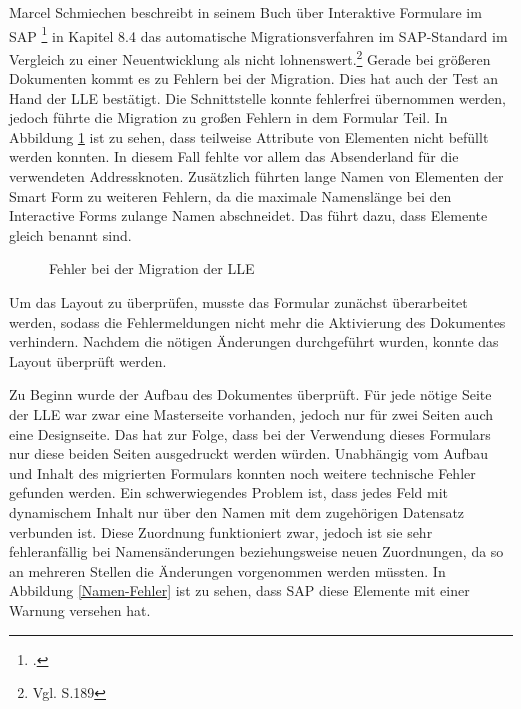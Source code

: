 Marcel Schmiechen beschreibt in seinem Buch über Interaktive Formulare im SAP \footcite{Schmiechen.2016} in Kapitel 8.4 das automatische Migrationsverfahren im SAP-Standard im Vergleich zu einer Neuentwicklung als nicht lohnenswert.\footnote{Vgl. \cite{Schmiechen.2016} S.189} Gerade bei größeren Dokumenten kommt es zu Fehlern bei der Migration. Dies hat auch der Test an Hand der \ac{LLE} bestätigt. Die Schnittstelle konnte fehlerfrei übernommen werden, jedoch führte die Migration zu großen Fehlern in dem Formular Teil. In Abbildung \ref{Migration} ist zu sehen, dass teilweise Attribute von Elementen nicht befüllt werden konnten. In diesem Fall fehlte vor allem das Absenderland für die verwendeten Addressknoten. Zusätzlich führten lange Namen von Elementen der Smart Form zu weiteren Fehlern, da die maximale Namenslänge bei den Interactive Forms zulange Namen abschneidet. Das führt dazu, dass Elemente gleich benannt sind.
\begin{figure}[ht]
	\centering
	\caption{Fehler bei der Migration der \acs{LLE}}
	\label{Migration}
\end{figure}
Um das Layout zu überprüfen, musste das Formular zunächst überarbeitet werden, sodass die Fehlermeldungen nicht mehr die Aktivierung des Dokumentes verhindern. Nachdem die nötigen Änderungen durchgeführt wurden, konnte das Layout überprüft werden. 

Zu Beginn wurde der Aufbau des Dokumentes überprüft. Für jede nötige Seite der \ac{LLE} war zwar eine Masterseite vorhanden, jedoch nur für zwei Seiten auch eine Designseite. Das hat zur Folge, dass bei der Verwendung dieses Formulars nur diese beiden Seiten ausgedruckt werden würden. Unabhängig vom Aufbau und Inhalt des migrierten Formulars konnten noch weitere technische Fehler gefunden werden. Ein schwerwiegendes Problem ist, dass jedes Feld mit dynamischem Inhalt nur über den Namen mit dem zugehörigen Datensatz verbunden ist. Diese Zuordnung funktioniert zwar, jedoch ist sie sehr fehleranfällig bei Namensänderungen beziehungsweise neuen Zuordnungen, da so an mehreren Stellen die Änderungen vorgenommen werden müssten. In Abbildung \ref{Namen-Fehler} ist zu sehen, dass SAP diese Elemente mit einer Warnung versehen hat.

